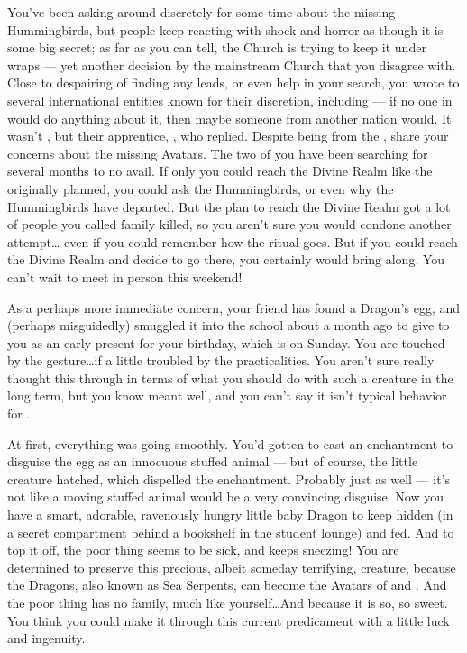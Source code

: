 \documentclass[char]{GL2020}
\begin{document}
You've been asking around discretely for some time about the missing Hummingbirds, but people keep reacting with shock and horror as though it is some big secret; as far as you can tell, the Church is trying to keep it under wraps — yet another decision by the mainstream Church that you disagree with. Close to despairing of finding any leads, or even help in your search, you wrote to several international entities known for their discretion, including \cHeadDiplomat{\full} — if no one in \pFarm{}would do anything about it, then maybe someone from another nation would. It wasn't \cHeadDiplomat{}, but their apprentice, \cJuniorStatesman{\full}, who replied. Despite being from the \pShip{}, \cJuniorStatesman{\they} share\cJuniorStatesman{\verbs} your concerns about the missing Avatars. The two of you have been searching for several months to no avail. If only you could reach the Divine Realm like the \cDisneySect{} originally planned, you could ask the Hummingbirds, or even \cFarmGod{} \cFarmGod{\themself} why the Hummingbirds have departed. But the plan to reach the Divine Realm got a lot of people you called family killed, so you aren't sure you would condone another attempt\ldots{} even if you could remember how the ritual goes. But if you could reach the Divine Realm and decide to go there, you certainly would bring \cJuniorStatesman{} along. You can’t wait to meet \cJuniorStatesman{\them} in person this weekend!
 
As a perhaps more immediate concern, your friend \cPirateChild{} has found a Dragon's egg, and (perhaps misguidedly) smuggled it into the school about a month ago to give to you as an early present for your birthday, which is on Sunday.  You are touched by the gesture\ldots{}if a little troubled by the practicalities. You aren't sure \cPirateChild{} really thought this through in terms of what you should do with such a creature in the long term, but you know \cPirateChild{\they} meant well, and you can’t say it isn’t typical behavior for \cPirateChild{\them}.

At first, everything was going smoothly. You'd gotten \cAdopted{} to cast an enchantment to disguise the egg as an innocuous stuffed animal — but of course, the little creature hatched, which dispelled the enchantment. Probably just as well — it's not like a moving stuffed animal would be a very convincing disguise. Now you have a smart, adorable, ravenously hungry little baby Dragon to keep hidden (in a secret compartment behind a bookshelf in the student lounge) and fed. And to top it off, the poor thing seems to be sick, and keeps sneezing! You are determined to preserve this precious, albeit someday terrifying, creature, because the Dragons, also known as Sea Serpents, can become the Avatars of \cEbbFull{\full} and \cFlowFull{\full}. And the poor thing has no family, much like yourself\ldots{}And because it is so, so sweet. You think you could make it through this current predicament with a little luck and ingenuity.
\end{document}
